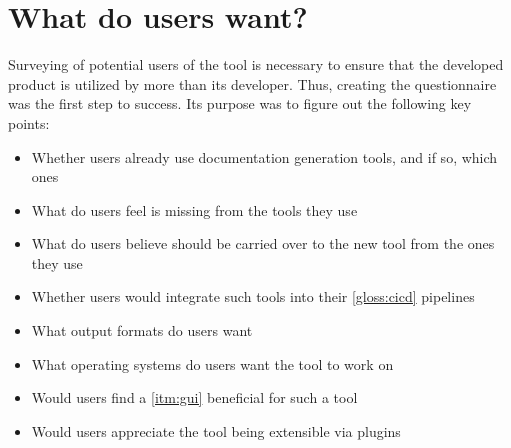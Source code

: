 \section{What do users want?}
Surveying of potential users of the tool is necessary to ensure that the developed product is utilized by more than its developer.
Thus, creating the questionnaire was the first step to success. Its purpose was to figure out the following key points:
\begin{itemize}
    \item Whether users already use documentation generation tools, and if so, which ones
    \item What do users feel is missing from the tools they use
    \item What do users believe should be carried over to the new tool from the ones they use
    \item Whether users would integrate such tools into their \ref{gloss:cicd} pipelines
    \item What output formats do users want
    \item What operating systems do users want the tool to work on
    \item Would users find a \ref{itm:gui} beneficial for such a tool
    \item Would users appreciate the tool being extensible via plugins
\end{itemize}
